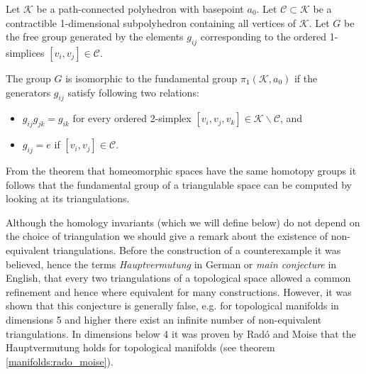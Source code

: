 


    \begin{theorem}
        Let $\mathcal{K}$ be a path-connected polyhedron with basepoint $a_0$. Let $\mathcal{C}\subset\mathcal{K}$ be a contractible 1-dimensional subpolyhedron containing all vertices of $\mathcal{K}$. Let $G$ be the free group generated by the elements $g_{ij}$ corresponding to the ordered 1-simplices $[v_i,v_j]\in\mathcal{C}$.

        The group $G$ is isomorphic to the fundamental group $\pi_1(\mathcal{K}, a_0)$ if the generators $g_{ij}$ satisfy following two relations:
        \begin{itemize}
            \item $g_{ij}g_{jk} = g_{ik}$ for every ordered 2-simplex $[v_i,v_j,v_k]\in\mathcal{K}\backslash\mathcal{C}$, and
            \item $g_{ij} = e$ if $[v_i,v_j]\in\mathcal{C}$.
        \end{itemize}
    \end{theorem}
    \begin{result}
        From the theorem that homeomorphic spaces have the same homotopy groups it follows that the fundamental group of a triangulable space can be computed by looking at its triangulations.
    \end{result}

    \begin{remark}
        Although the homology invariants (which we will define below) do not depend on the choice of triangulation we should give a remark about the existence of non-equivalent triangulations. Before the construction of a counterexample it was believed, hence the terms \textit{Hauptvermutung} in German or \textit{main conjecture} in English, that every two triangulations of a topological space allowed a common refinement and hence where equivalent for many constructions. However, it was shown that this conjecture is generally false, e.g. for topological manifolds in dimensions 5 and higher there exist an infinite number of non-equivalent triangulations. In dimensions below 4 it was proven by Rad\'o and Moise that the Hauptvermutung holds for topological manifolds (see theorem \ref{manifolds:rado_moise}).
    \end{remark}

